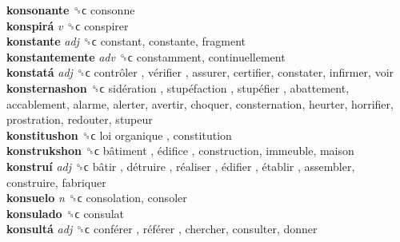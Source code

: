 \textbf{konsonante} ␝ϲ  consonne  \\
\textbf{konspirá} \emph{v}  ␝ϲ  conspirer  \\
\textbf{konstante} \emph{adj}  ␝ϲ  constant, constante, fragment  \\
\textbf{konstantemente} \emph{adv}  ␝ϲ  constamment, continuellement  \\
\textbf{konstatá} \emph{adj}  ␝ϲ   contrôler ,  vérifier , assurer, certifier, constater, infirmer, voir  \\
\textbf{konsternashon} ␝ϲ   sidération ,  stupéfaction ,  stupéfier , abattement, accablement, alarme, alerter, avertir, choquer, consternation, heurter, horrifier, prostration, redouter, stupeur  \\
\textbf{konstitushon} ␝ϲ   loi organique , constitution  \\
\textbf{konstrukshon} ␝ϲ   bâtiment ,  édifice , construction, immeuble, maison  \\
\textbf{konstruí} \emph{adj}  ␝ϲ   bâtir ,  détruire ,  réaliser ,  édifier ,  établir , assembler, construire, fabriquer  \\
\textbf{konsuelo} \emph{n}  ␝ϲ  consolation, consoler  \\
\textbf{konsulado} ␝ϲ  consulat  \\
\textbf{konsultá} \emph{adj}  ␝ϲ   conférer ,  référer , chercher, consulter, donner  \\
